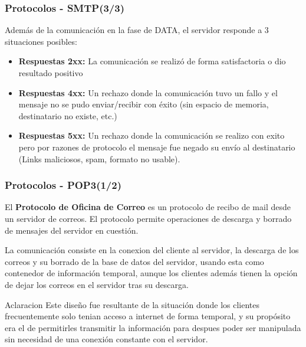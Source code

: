 \documentclass{beamer}
\begin{document}
\begin{frame}
\frametitle{Protocolos -  SMTP(3/3)}
\tableofcontents
Además de la comunicación en la fase de DATA, el servidor responde a 3 situaciones posibles:
\begin{itemize}
\item  \small \textbf{Respuestas 2xx:} La comunicación se realizó de forma satisfactoria o dio resultado positivo
\item  \small \textbf{Respuestas 4xx:} Un rechazo donde la comunicación tuvo un fallo y el mensaje no se pudo enviar/recibir con éxito (sin espacio de memoria, destinatario no existe, etc.)
\item  \small \textbf{Respuestas 5xx:} Un rechazo donde la comunicación se realizo con exito pero por razones de protocolo el mensaje fue negado su envío al destinatario (Links maliciosos, spam, formato no usable).
\end{itemize}

\end{frame}

\begin{frame}
\frametitle{Protocolos -  POP3(1/2)}
\tableofcontents
El\textbf{ Protocolo de Oficina de Correo} es un protocolo de recibo de mail desde un servidor de correos. El protocolo permite operaciones de descarga y borrado de mensajes del servidor en cuestión.

La comunicación consiste en la conexion del cliente al servidor, la descarga de los correos y su borrado de la base de datos del servidor, usando esta como contenedor de información temporal, aunque los clientes además tienen la opción de dejar los correos en el servidor tras su descarga.

\begin{block}{Aclaracion}
\small Este diseño fue resultante de la situación donde los clientes frecuentemente solo tenian acceso a internet de forma temporal, y su propósito era el de permitirles transmitir la información para despues poder ser manipulada sin necesidad de una conexión constante con el servidor.
\end{block}

\end{frame}
\end{document}
